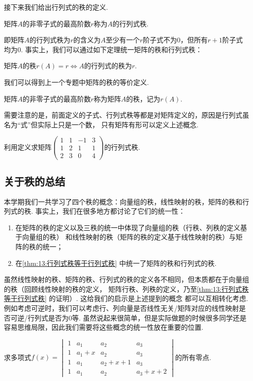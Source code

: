 接下来我们给出行列式的秩的定义.
\begin{definition}
    矩阵$A$的非零子式的最高阶数$r$称为$A$的行列式秩.
\end{definition}
即矩阵$A$的行列式秩为$r$的含义为$A$至少有一个$r$阶子式不为0，但所有$r+1$阶子式均为0.
事实上，我们可以通过如下定理统一矩阵的秩和行列式秩：
\begin{theorem}\label{thm:13:行列式秩等于行列式秩}
    矩阵$A$的秩$r(A)=r \iff A$的行列式的秩为$r$.
\end{theorem}
我们可以得到上一个专题中矩阵的秩的等价定义.
\begin{definition}
    矩阵$A$的非零子式的最高阶数$r$称为矩阵$A$的秩，记为$r(A)$.
\end{definition}

需要注意的是，前面定义的子式、行列式秩等都是对矩阵定义的，原因是行列式虽名为``式''但实际上只是一个数，
只有矩阵有形可以定义上述概念.
\begin{example}
    利用定义求矩阵$\begin{pmatrix}
        1 & 1 & -1 & 3 \\ 1 & 2 & 1 & 1 \\ 2 & 3 & 0 & 4
    \end{pmatrix}$的行列式秩.
\end{example}
\begin{solution}

\end{solution}

\subsection{关于秩的总结}
本学期我们一共学习了四个秩的概念：向量组的秩，线性映射的秩，矩阵的秩和行列式的秩.
事实上，我们在很多地方都讨论了它们的统一性：
\begin{enumerate}
    \item 在矩阵的秩的定义以及三秩的统一中体现了向量组的秩（行秩、列秩的定义基于向量组的秩）
    和线性映射的秩（矩阵的秩的定义基于线性映射的秩）与矩阵的秩的统一；
    \item 在\autoref{thm:13:行列式秩等于行列式秩} 中统一了矩阵的秩和行列式的秩.
\end{enumerate}
虽然线性映射的秩、矩阵的秩、行列式的秩的定义各不相同，但本质都在于向量组的秩（回顾线性映射的秩的定义，
矩阵行秩、列秩的定义，乃至\autoref{thm:13:行列式秩等于行列式秩} 的证明）. 这给我们的启示是上述提到的概念
都可以互相转化考虑.例如考虑可逆时，我们可以考虑行、列向量是否线性无关/矩阵对应的线性映射是否可逆/行列式是否为0等.
虽然说起来很简单，但是实际做题的时候很多同学还是容易思维局限，因此我们需要将这些概念的统一性放在重要的位置.
\begin{example}
    求多项式$f(x)=\begin{vmatrix}
		1 & a_1 & a_2 & a_3 \\
		1 & a_1+x & a_2 & a_3 \\
		1 & a_1 & a_2+x+1 & a_3 \\
		1 & a_1 & a_2 & a_3+x+2
	\end{vmatrix}$的所有零点.
\end{example}

